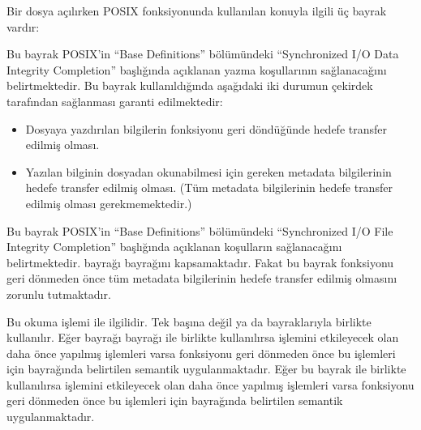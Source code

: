 \documentclass[a4paper,10pt,turkish]{sphinxmanual}
\begin{document}
\sphinxAtStartPar
Bir dosya açılırken  POSIX fonksiyonunda kullanılan konuyla ilgili üç bayrak vardır:
\begin{description}
\sphinxAtStartPar
Bu bayrak POSIX’in “Base Definitions” bölümündeki “Synchronized I/O Data Integrity Completion”
başlığında açıklanan yazma koşullarının sağlanacağını belirtmektedir. Bu bayrak kullanıldığında
aşağıdaki iki durumun çekirdek tarafından sağlanması garanti edilmektedir:
\begin{itemize}
\item {} 
\sphinxAtStartPar
Dosyaya yazdırılan bilgilerin  fonksiyonu geri döndüğünde hedefe transfer edilmiş
olması.

\item {} 
\sphinxAtStartPar
Yazılan bilginin dosyadan okunabilmesi için gereken metadata bilgilerinin hedefe transfer
edilmiş olması. (Tüm metadata bilgilerinin hedefe transfer edilmiş olması gerekmemektedir.)

\end{itemize}

\sphinxAtStartPar
Bu bayrak POSIX’in “Base Definitions” bölümündeki “Synchronized I/O File Integrity Completion”
başlığında açıklanan koşulların sağlanacağını belirtmektedir.  bayrağı 
bayrağını kapsamaktadır. Fakat bu bayrak  fonksiyonu geri dönmeden önce tüm metadata
bilgilerinin hedefe transfer edilmiş olmasını zorunlu tutmaktadır.

\sphinxAtStartPar
Bu okuma işlemi ile ilgilidir. Tek başına değil  ya da  bayraklarıyla
birlikte kullanılır. Eğer  bayrağı  bayrağı ile birlikte kullanılırsa
 işlemini etkileyecek olan daha önce yapılmış  işlemleri varsa 
fonksiyonu geri dönmeden önce bu  işlemleri için  bayrağında belirtilen
semantik uygulanmaktadır. Eğer bu bayrak  ile birlikte kullanılırsa  işlemini
etkileyecek olan daha önce yapılmış  işlemleri varsa  fonksiyonu geri dönmeden
önce bu  işlemleri için  bayrağında belirtilen semantik uygulanmaktadır.

\end{description}
\end{document}
